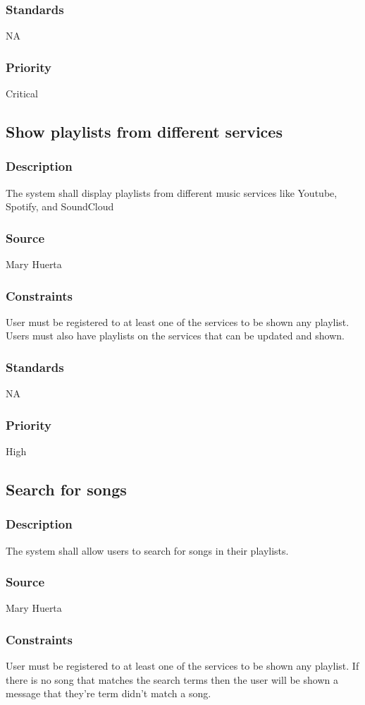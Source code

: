 \subsubsection{Standards}
NA
\subsubsection{Priority}
Critical


\subsection{Show playlists from different services}
\subsubsection{Description}
The system shall display playlists from different music services like Youtube, Spotify, and SoundCloud
\subsubsection{Source}
Mary Huerta
\subsubsection{Constraints}
User must be registered to at least one of the services to be shown any playlist. Users must also have playlists on the services that can be updated and shown.
\subsubsection{Standards}
NA
\subsubsection{Priority}
High



\subsection{Search for songs}
\subsubsection{Description}
The system shall allow users to search for songs in their playlists. 
\subsubsection{Source}
Mary Huerta
\subsubsection{Constraints}
User must be registered to at least one of the services to be shown any playlist. If there is no song that matches the search terms then the user will be shown a message that they're term didn't match a song.
